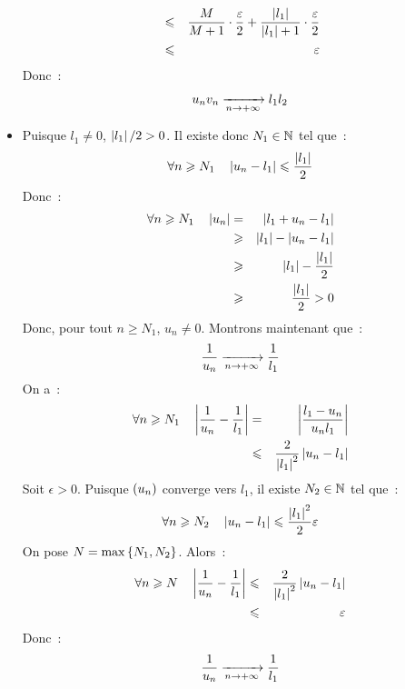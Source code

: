 \documentclass{magnoliaold}
\begin{document}
\begin{preuve}
\begin{itemize}
\begin{eqnarray*}
  &\leqslant& \frac{M}{M+1}\cdot\frac{\varepsilon}{2}+
      \frac{\left|l_1\right|}{\left|l_1\right|+1}\cdot\frac{\varepsilon}{2}\\
  &\leqslant& \varepsilon
  \end{eqnarray*}
  Donc~:
  \[u_n v_n \xrightarrow[n\rightarrow +\infty]{} l_1 l_2\]
\item Puisque $l_1\neq 0$, $\left|l_1\right|/2>0$. Il existe donc $N_1\in\mathbb{N}$ tel que~:
  \[\forall n\geqslant N_1 \quad \left|u_n-l_1\right|\leqslant\frac{\left|l_1\right|}{2}\]
  Donc~:
  \begin{eqnarray*}
  \forall n\geqslant N_1 \quad \left|u_n\right|
  &=& \left|l_1+u_n-l_1\right|\\
  &\geqslant& \left|l_1\right|-\left|u_n-l_1\right|\\
  &\geqslant& \left|l_1\right|-\frac{\left|l_1\right|}{2}\\
  &\geqslant& \frac{\left|l_1\right|}{2} > 0
  \end{eqnarray*}
  Donc, pour tout $n\geq N_1$, $u_n\neq 0$. Montrons maintenant que~:
  \[\frac{1}{u_n} \xrightarrow[n\rightarrow +\infty]{} \frac{1}{l_1}\]
  On a~:
  \begin{eqnarray*}
  \forall n \geqslant N_1 \quad \left|\frac{1}{u_n}-\frac{1}{l_1}\right|
  &=& \left|\frac{l_1-u_n}{u_n l_1}\right|\\
  &\leqslant& \frac{2}{\left|l_1\right|^2} \left|u_n-l_1\right|
  \end{eqnarray*}
  Soit $\epsilon>0$. Puisque $\left(u_n\right)$ converge vers $l_1$, il existe $N_2\in\mathbb{N}$
  tel que~:
  \[\forall n\geqslant N_2 \quad \left|u_n-l_1\right|\leqslant \frac{\left|l_1\right|^2}{2}\varepsilon\]
  On pose $N=\max\left\{N_1,N_2\right\}$. Alors~:
  \begin{eqnarray*}
  \forall n \geqslant N \quad \left|\frac{1}{u_n}-\frac{1}{l_1}\right|
  &\leqslant& \frac{2}{\left|l_1\right|^2} \left|u_n-l_1\right|\\
  &\leqslant& \varepsilon
  \end{eqnarray*}
  Donc~:
  \[\frac{1}{u_n}\xrightarrow[n\rightarrow +\infty]{}\frac{1}{l_1}\]
\end{itemize} 
\end{preuve}
\end{document}
